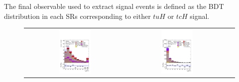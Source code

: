The final observable used to extract signal events is defined as the BDT distribution in each SRs corresponding to either $tuH$ or $tcH$ signal.
%
\begin{figure}[H]
\centering
\begin{tabular}{@{}ccc@{}}
\includegraphics[page=1,width=0.33\textwidth]{figures/reg1l2tau1bnj_os.pdf} &
\includegraphics[page=1,width=0.33\textwidth]{figures/reg1l1tau1b1j_ss.pdf}&

\end{tabular}
\end{figure}
